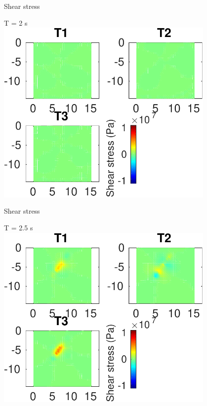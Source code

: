 \documentclass{beamer}
\begin{document}
\begin{frame}
 {Shear stress}
 
 \centering \Large T = 2 s\\
 \includegraphics[width=0.8\textwidth]{images/vertical_00026}
 
\end{frame}

\begin{frame}
 {Shear stress}
 
 \centering \Large T = 2.5 s\\
 \includegraphics[width=0.8\textwidth]{images/vertical_00031}
 
\end{frame}
\end{document}
